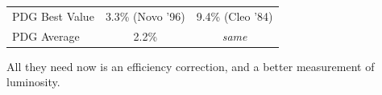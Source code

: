 \begin{slide*}
\begin{minipage}[t]{\linewidth}
\begin{center}
\begin{tabular}{l c c}
    PDG Best Value                    & \hspace{1.5cm} 3.3\% {\scriptsize \sc (Novo '96)} & \hspace{1.5cm} 9.4\% {\scriptsize \sc (Cleo '84)} \\
    PDG Average                       & 2.2\%            & {\it same}

  \end{tabular}
\end{center}

\end{minipage}

\end{slide*}


\begin{slide*}

\slideframe{}
\huge
{}

\begin{minipage}[t]{\linewidth}
\large

\vspace{0.1cm}

All they need now is an efficiency correction, and a better
measurement of luminosity.

\vspace{0.1cm}


\end{minipage}
\end{slide*}
